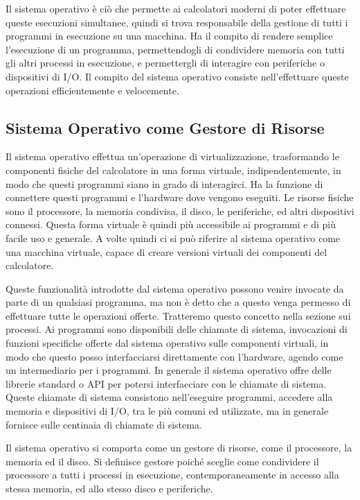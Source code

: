 \documentclass{article}
\numberwithin{equation}{subsection}
\begin{document}
Il sistema operativo è ciò che permette ai calcolatori moderni di poter effettuare queste esecuzioni simultanee, quindi si trova responsabile della gestione di tutti i 
programmi in esecuzione su una macchina. 
Ha il compito di rendere semplice l'esecuzione di un programma, permettendogli di condividere memoria con tutti gli altri processi in esecuzione, e permettergli di 
interagire con periferiche o dispositivi di I/O. Il compito del sistema operativo consiste nell'effettuare queste operazioni efficientemente e velocemente. 

\subsection{Sistema Operativo come Gestore di Risorse}

Il sistema operativo effettua un'operazione di virtualizzazione, trasformando le componenti fisiche del calcolatore in una forma virtuale, indipendentemente, in modo che 
questi programmi siano in grado di interagirci. Ha la funzione di connettere questi programmi e l'hardware dove vengono eseguiti. Le risorse fisiche sono il processore, 
la memoria condivisa, il disco, le periferiche, ed altri dispositivi connessi. Questa forma virtuale è quindi più accessibile ai programmi e di più facile uso e generale. 
A volte quindi ci si può riferire al sistema operativo come una macchina virtuale, capace di creare versioni virtuali dei componenti del calcolatore. 

Queste funzionalità introdotte dal sistema operativo possono venire invocate da parte di un qualsiasi programma, ma non è detto che a questo venga permesso di effettuare 
tutte le operazioni offerte. Tratteremo questo concetto nella sezione sui processi. 
Ai programmi sono disponibili delle chiamate di sistema, invocazioni di funzioni specifiche offerte dal sistema operativo sulle componenti virtuali, in modo che questo 
posso interfacciarsi direttamente con l'hardware, agendo come un intermediario per i programmi. In generale il sistema operativo offre delle librerie standard o API per 
potersi interfacciare con le chiamate di sistema. 
Queste chiamate di sistema consistono nell'eseguire programmi, accedere alla memoria e dispositivi di I/O, tra le più comuni ed utilizzate, ma in generale fornisce 
sulle centinaia di chiamate di sistema. 


Il sistema operativo si comporta come un gestore di risorse, come il processore, la memoria ed il disco. Si definisce gestore poiché sceglie come condividere il 
processore a tutti i processi in esecuzione, contemporaneamente in accesso alla stessa memoria, ed allo stesso disco e periferiche. 
\end{document}
